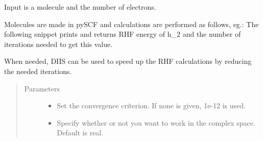 \documentclass[letterpaper,10pt,english]{sphinxmanual}
\begin{document}
\begin{fulllineitems}
\label{\detokenize{RHF:ghf.RHF.RHF}}
Input is a molecule and the number of electrons.

Molecules are made in pySCF and calculations are performed as follows, eg.:
The following snippet prints and returns RHF energy of h\_2
and the number of iterations needed to get this value.

\begin{sphinxVerbatim}[commandchars=\\\{\}]
          
   
\end{sphinxVerbatim}

\begin{fulllineitems}
\label{\detokenize{RHF:ghf.RHF.RHF.diis}}
When needed, DIIS can be used to speed up the RHF calculations by reducing the needed iterations.
\begin{quote}\begin{description}
\item[{Parameters}] \leavevmode\begin{itemize}
\item {} 
 \textendash{} Set the convergence criterion. If none is given, 1e-12 is used.

\item {} 
 \textendash{} Specify whether or not you want to work in the complex space. Default is real.


\end{itemize}
\end{description}
\end{quote}
\end{fulllineitems}
\end{fulllineitems}
\end{document}
